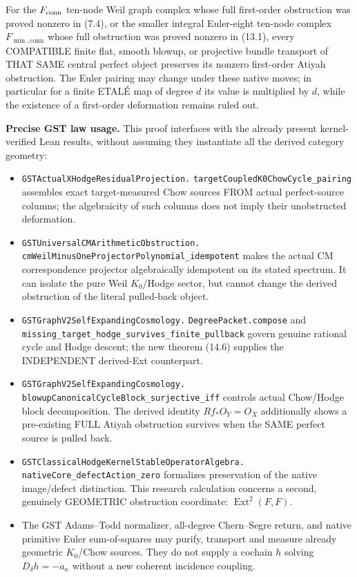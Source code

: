 \documentclass[11pt,a4paper]{article}
\begin{document}
\begin{corollary}
For the
\(F_{\rm conn}\)
ten-node
Weil graph
complex whose
full first-order
obstruction was
proved nonzero in
(7.4), or the
smaller integral
Euler-eight
ten-node complex
\(F_{\min,\mathrm{conn}}\)
whose full
obstruction was
proved nonzero in
(13.1),
every COMPATIBLE
finite flat,
smooth blowup,
or projective
bundle transport
of THAT SAME
central perfect
object preserves
its nonzero
first-order
Atiyah obstruction.
The Euler
pairing may
change under
these native
moves; in
particular for
a finite
ETALÉ map
of degree \(d\)
its value is
multiplied by
\(d\), while
the existence
of a first-order
deformation
remains ruled out.
\end{corollary}

\noindent\textbf{Precise GST law usage.}
This proof
interfaces
with the
already present
kernel-verified
Lean results,
without assuming
they instantiate
all the derived
category geometry:
\begin{itemize}
 \item
 \texttt{GSTActualXHodgeResidualProjection.}
 \texttt{targetCoupledK0ChowCycle\_pairing}
 assembles exact
 target-measured
 Chow sources
 FROM actual
 perfect-source
 columns; the
 algebraicity of
 such columns
 does not imply
 their unobstructed
 deformation.
 \item
 \texttt{GSTUniversalCMArithmeticObstruction.}
 \texttt{cmWeilMinusOneProjectorPolynomial\_idempotent}
 makes the actual
 CM correspondence
 projector
 algebraically
 idempotent
 on its stated
 spectrum.
 It can
 isolate the
 pure Weil
 \(K_0\)/Hodge
 sector, but
 cannot change
 the derived
 obstruction
 of the literal
 pulled-back object.
 \item
 \texttt{GSTGraphV2SelfExpandingCosmology.}
 \texttt{DegreePacket.compose}
 and
 \texttt{missing\_target\_hodge\_survives\_finite\_pullback}
 govern genuine
 rational cycle
 and Hodge
 descent; the
 new theorem
 (14.6)
 supplies the
 INDEPENDENT
 derived-Ext
 counterpart.
 \item
 \texttt{GSTGraphV2SelfExpandingCosmology.}
 \texttt{blowupCanonicalCycleBlock\_surjective\_iff}
 controls actual
 Chow/Hodge
 block
 decomposition.
 The derived
 identity
 \(Rf_*O_Y=O_X\)
 additionally
 shows a
 pre-existing
 FULL Atiyah
 obstruction
 survives when
 the SAME
 perfect source
 is pulled back.
 \item
 \texttt{GSTClassicalHodgeKernelStableOperatorAlgebra.}
 \texttt{nativeCore\_defectAction\_zero}
 formalizes
 preservation of
 the native
 image/defect
 distinction.
 This research
 calculation
 concerns a
 second,
 genuinely
 GEOMETRIC
 obstruction
 coordinate:
 \(\operatorname{Ext}^2(F,F)\).
 \item
 The GST
 Adams--Todd
 normalizer,
 all-degree
 Chern--Segre
 return, and
 native
 primitive
 Euler
 sum-of-squares
 may purify,
 transport and
 measure
 already
 geometric
 \(K_0\)/Chow
 sources.
 They do
 not supply
 a cochain
 \(h\) solving
 \(D_\delta h=-a_\kappa\)
 without
 a new
 coherent
 incidence
 coupling.
\end{itemize}
\end{document}
